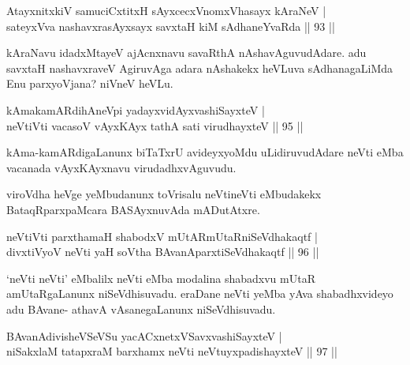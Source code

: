 \begin{shl}
AtayxnitxkiV samuciCxtitxH sAyxcecxVnomxVhasayx kAraNeV |\\
sateyxVva nashavxrasAyxsayx savxtaH kiM sAdhaneYvaRda \hfill || 93 ||
\end{shl}

\begin{artha}
kAraNavu idadxMtayeV ajAcnxnavu savaRthA nAshavAguvudAdare. adu savxtaH nashavxraveV AgiruvAga adara nAshakekx heVLuva sAdhanagaLiMda Enu parxyoVjana? niVneV heVLu.
\end{artha}


\begin{shl}
kAmakamARdihAneV\s pi yadayxvidAyx\s vashiSayxteV |\\
neVtiVti vacasoV vAyxKAyx tathA sati virudhayxteV \hfill || 95 ||
\end{shl}

\begin{artha}
kAma-kamARdigaLanunx biTaTxrU avideyxyoMdu uLidiruvudAdare neVti eMba vacanada vAyxKAyxnavu virudadhxvAguvudu.
\end{artha}

\begin{artha}
viroVdha heVge yeMbudanunx toVrisalu neVtineVti eMbudakekx BataqRparxpaMcara BASAyxnuvAda mADutAtxre.
\end{artha}

\begin{shl}
neVtiVti parxthamaH shabodxV mUtARmUtaRniSeVdhakaqtf |\\
divxtiVyoV neVti yaH soV\s tha BAvanAparxtiSeVdhakaqtf \hfill || 96 ||
\end{shl}

\begin{artha}
`neVti neVti' eMbalilx neVti eMba modalina shabadxvu mUtaR amUtaRgaLanunx niSeVdhisuvadu. eraDane neVti yeMba yAva shabadhxvideyo adu BAvane- athavA vAsanegaLanunx niSeVdhisuvadu.
\end{artha}


\begin{shl}
BAvanAdivisheVSeVSu yacACxnetxVSavxvashiSayxteV |\\
niSakxlaM tatapxraM barxhamx neVti neVtuyxpadishayxteV \hfill || 97 ||
\end{shl}

